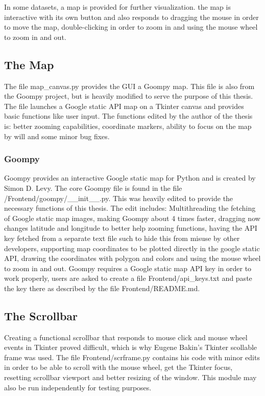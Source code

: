 In some datasets, a map is provided for further visualization. the map is interactive with its own button and also responds to dragging the mouse in order to move the map, double-clicking in order to zoom in and using the mouse wheel to zoom in and out.

\subsection{The Map}
The file map\_canvas.py provides the GUI a Goompy\cite{goompy} map. This file is also from the Goompy project, but is heavily modified to serve the purpose of this thesis. The file launches a Google static API map on a Tkinter canvas and provides basic functions like user input. The functions edited by the author of the thesis is: better zooming capabilities, coordinate markers, ability to focus on the map by will and some minor bug fixes.

\subsubsection{Goompy}
Goompy\cite{goompy} provides an interactive Google static map for Python and is created by Simon D. Levy.
The core Goompy file is found in the file /Frontend/goompy/\_\_init\_\_.py. This was heavily edited to provide the necessary functions of this thesis. The edit includes: Multithreading the fetching of Google static map images, making Goompy about 4 times faster, dragging now changes latitude and longitude to better help zooming functions, having the API key fetched from a separate text file such to hide this from misuse by other developers, supporting map coordinates to be plotted directly in the google static API, drawing the coordinates with polygon and colors and using the mouse wheel to zoom in and out. Goompy requires a Google static map API key in order to work properly, users are asked to create a file Frontend/api\_keys.txt and paste the key there as described by the file Frontend/README.md.

\subsection{The Scrollbar}
Creating a functional scrollbar that responds to mouse click and mouse wheel events in Tkinter proved difficult, which is why Eugene Bakin's Tkinter scollable\cite{scrframe} frame was used. The file Frontend/scrframe.py contains his code with minor edits in order to be able to scroll with the mouse wheel, get the Tkinter focus, resetting scrollbar viewport and better resizing of the window. This module may also be run independently for testing purposes.





